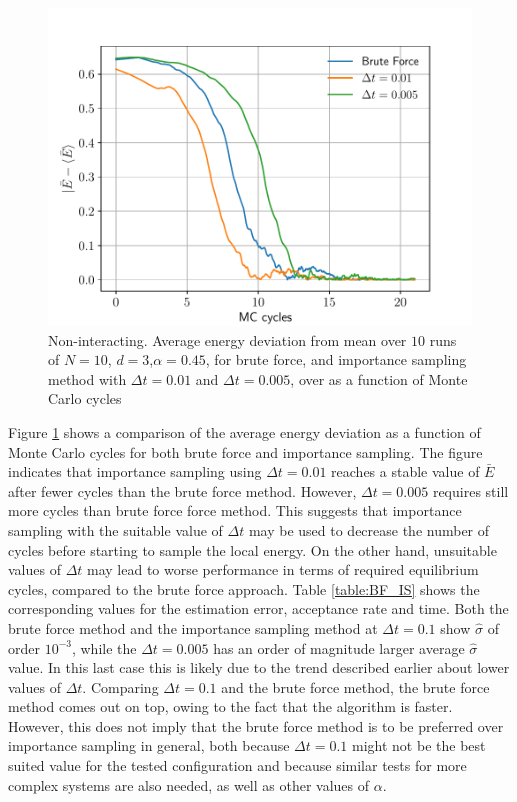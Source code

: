 \documentclass[%
oneside,                 %
final,                   %
10pt]{article}
\begin{document}
\begin{figure}[!h]
        \centering 
         \includegraphics[scale=0.6]{../Results/convergence_dt.pdf} 
        \caption{Non-interacting. Average energy deviation from mean over $10$ runs of $N=10$, $d=3$,$\alpha=0.45$, for brute force, and importance sampling method with $\Delta t=0.01$ and  $\Delta t=0.005$, over as a function of Monte Carlo cycles}
        \label{fig:compare_BF_IS}   
\end{figure}  

Figure \ref{fig:compare_BF_IS} shows a comparison of the average energy deviation as a function of Monte Carlo cycles for both brute force and importance sampling. The figure indicates that importance sampling using $\Delta t=0.01$ reaches a stable value of $\bar E$ after fewer cycles than the brute force method. However, $\Delta t =0.005$ requires still more cycles than brute force force method. This suggests that importance sampling with the suitable value of $\Delta t$ may be used to decrease the number of cycles before starting to sample the local energy. On the other hand, unsuitable values of $\Delta t$ may lead to worse performance in terms of required equilibrium cycles, compared to the brute force approach.  Table \ref{table:BF_IS} shows the corresponding values for the estimation error, acceptance rate and time. Both the brute force method and the importance sampling method at $\Delta t=0.1$ show $\hat \sigma$ of order $10^{-3}$, while the $\Delta t=0.005$ has an order of magnitude larger average $\hat \sigma$ value. In this last case this is likely due to the trend described earlier about lower values of $\Delta t$. Comparing $\Delta t=0.1$ and the brute force method, the brute force method comes out on top, owing to the fact that the algorithm is faster. However, this does not imply that the brute force method is to be preferred over importance sampling in general, both because $\Delta t=0.1$ might not be the best suited value for the tested configuration and because similar tests for more complex systems are also needed, as well as other values of $\alpha$.
\end{document}
